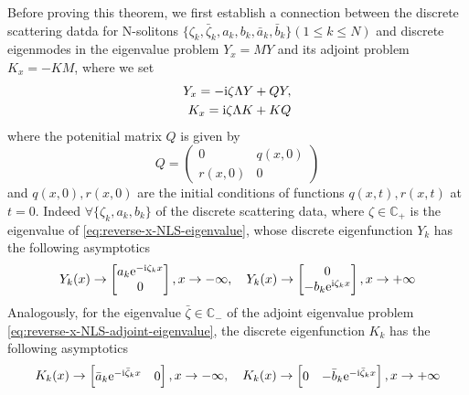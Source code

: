 Before proving this theorem, we first establish a connection between the discrete scattering datda for N-solitons $\{\zeta_{k}, \bar{\zeta}_{k}, a_{k}, b_{k}, \bar{a}_{k}, \bar{b}_{k}\}(1\leq k \leq N) $ and discrete eigenmodes in the eigenvalue problem $ Y_{x} = MY $ and its adjoint problem $ K_{x} = -KM $, where we set 
\begin{subequations}
\begin{align}
    Y_{x} = - \mathrm{i} \zeta \Lambda Y + QY, \label{eq:reverse-x-NLS-eigenvalue}\\
    K_{x} = \mathrm{i} \zeta \Lambda K + KQ \label{eq:reverse-x-NLS-adjoint-eigenvalue}
\end{align}
\end{subequations}
where the potenitial matrix $ Q $ is given by
\begin{equation}
    Q = \begin{pmatrix}
        0 & q(x,0) \\
        r(x,0) & 0
    \end{pmatrix}
\end{equation} 
and $ q(x,0), r(x,0) $ are the initial conditions of functions $ q(x,t), r(x,t) $ at $ t = 0 $. Indeed $ \forall \{ \zeta_{k}, a_{k}, b_{k} \} $ of the discrete scattering data, where $ \zeta \in \mathbb{C_{+}} $ is the eigenvalue of \eqref{eq:reverse-x-NLS-eigenvalue}, whose discrete eigenfunction $ Y_{k} $ has the following asymptotics 
\begin{equation}
    Y_{k}(x) \to \begin{bmatrix} a_{k} \mathrm{e}^{-\mathrm{i} \zeta_{k} x} \\ 0 \end{bmatrix}, x \to -\infty, \quad Y_{k}(x) \to \begin{bmatrix} 0 \\ -b_{k} \mathrm{e}^{\mathrm{i} \zeta_{k} x} \end{bmatrix}, x \to +\infty \label{eq:large-x-asymptotics-of-reverse-x-NLS-eigenfunction}
\end{equation}
Analogously, for the eigenvalue $ \bar{\zeta} \in \mathbb{C_{-}} $ of the adjoint eigenvalue problem \eqref{eq:reverse-x-NLS-adjoint-eigenvalue}, the discrete eigenfunction $ K_{k} $ has the following asymptotics 
\begin{equation}
    K_{k}(x) \to \begin{bmatrix} \bar{a}_{k} \mathrm{e}^{-\mathrm{i} \bar{\zeta}_{k} x} & 0 \end{bmatrix}, x \to -\infty, \quad K_{k}(x) \to \begin{bmatrix} 0 & -\bar{b}_{k}\mathrm{e}^{-\mathrm{i} \bar{\zeta}_{k}x} \end{bmatrix}, x \to +\infty \label{eq:large-x-asymptotics-of-reverse-x-NLS-adjoint-eigenfunction}
\end{equation}
